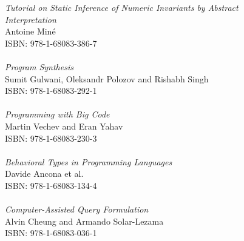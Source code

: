 \vspace{12pt}
\noindent \textit{Tutorial on Static Inference of Numeric Invariants by Abstract\\ Interpretation}\\
Antoine Min\'e\\
ISBN: 978-1-68083-386-7\\
\\
\noindent \textit{Program Synthesis}\\
Sumit Gulwani, Oleksandr Polozov and Rishabh Singh\\
ISBN: 978-1-68083-292-1\\
\\
\noindent \textit{Programming with Big Code}\\
Martin Vechev and Eran Yahav\\
ISBN: 978-1-68083-230-3
\\
\\
\noindent \textit{Behavioral Types in Programming Languages}\\
Davide Ancona et al.\\
ISBN: 978-1-68083-134-4
\\
\\
\noindent \textit{Computer-Assisted Query Formulation}\\
Alvin Cheung and Armando Solar-Lezama\\
ISBN: 978-1-68083-036-1